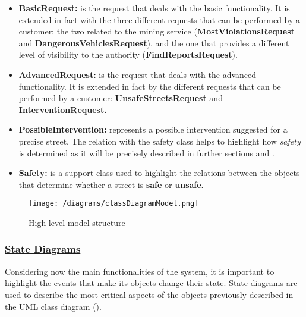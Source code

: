 \begin{itemize}
		\item \textbf{BasicRequest:} is the request that deals with the basic functionality. It is extended in fact with the three different requests that can be performed by a customer: the two related to the mining service (\textbf{MostViolationsRequest} and \textbf{DangerousVehiclesRequest}), and the one that provides a different level of visibility to the authority (\textbf{FindReportsRequest}).
		
		\item \textbf{AdvancedRequest:} is the request that deals with the advanced functionality. It is extended in fact by the different requests that can be performed by a customer: \textbf{UnsafeStreetsRequest} and \textbf{InterventionRequest.}
		
		\item \textbf{PossibleIntervention:} represents a possible intervention suggested for a precise street. The relation with the safety class helps to highlight how \emph{safety} is determined as it will be precisely described in further sections  and .
		
		\item \textbf{Safety:} is a support class used to highlight the relations between the objects that determine whether a street is \textbf{safe} or \textbf{unsafe}.
	\end{itemize}
	
	\begin{figure}[h!]
		\centering
		\texttt{[image: /diagrams/classDiagramModel.png]}
		\caption{\label{fig:classDiagram}High-level model structure}
	\end{figure}

	\FloatBarrier
	
	\subsubsection[State Diagrams]{\hyperlink{toc}{State Diagrams}}
	\label{sec:stateDiagrams}
		Considering now the main functionalities of the system, it is important to highlight the events that make its objects change their state. State diagrams are used to describe the most critical aspects of the objects previously described in the UML class diagram ().
		
